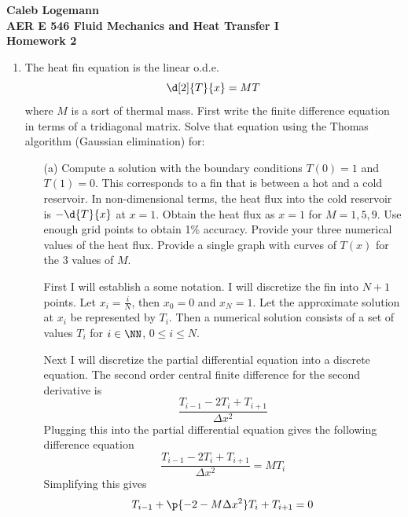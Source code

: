 \documentclass[11pt, oneside]{article}
\begin{document}
\noindent \textbf{\Large{Caleb Logemann \\
AER E 546 Fluid Mechanics and Heat Transfer I \\
Homework 2
}}

%
\begin{enumerate}
  \item %
    The heat fin equation is the linear o.d.e.
    \[
      \d[2]{T}{x} = MT
    \]
    where $M$ is a sort of thermal mass.
    First write the finite difference equation in terms of a tridiagonal matrix.
    Solve that equation using the Thomas algorithm (Gaussian elimination) for:
    \begin{enumerate}
      \item[(a)] %
        Compute a solution with the boundary conditions $T(0) = 1$ and
        $T(1) = 0$.
        This corresponds to a fin that is between a hot and a cold reservoir.
        In non-dimensional terms, the heat flux into the cold reservoir is
        $-\d{T}{x}$ at $x = 1$.
        Obtain the heat flux as $x = 1$ for $M = 1, 5, 9$. Use enough grid
        points to obtain 1\% accuracy.
        Provide your three numerical values of the heat flux.
        Provide a single graph with curves of $T(x)$ for the 3 values of $M$.

        First I will establish a some notation.
        I will discretize the fin into $N + 1$ points.
        Let $x_i = \frac{i}{N}$, then $x_0 = 0$ and $x_N = 1$.
        Let the approximate solution at $x_i$ be represented by $T_i$.
        Then a numerical solution consists of a set of values $T_i$ for
        $i \in \NN$, $0 \le i \le N$.

        Next I will discretize the partial differential equation into a discrete
        equation.
        The second order central finite difference for the second derivative is
        \[
          \frac{T_{i - 1} - 2T_i + T_{i+1}}{\Delta x^2}
        \]
        Plugging this into the partial differential equation gives the following
        difference equation
        \[
          \frac{T_{i - 1} - 2T_i + T_{i+1}}{\Delta x^2} = MT_i
        \]
        Simplifying this gives
        \[
          T_{i - 1} + \p{- 2 - M\Delta x^2}T_i + T_{i+1} = 0
        \]


\end{enumerate}
\end{enumerate}
\end{document}
